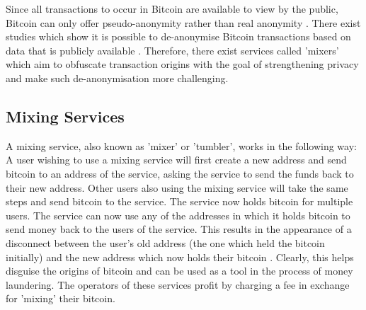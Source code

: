 Since all transactions to occur in Bitcoin are available to view by the public, Bitcoin can only offer pseudo-anonymity rather than real anonymity \cite{RefWorks:doc:5c3db7d6e4b0fa2b1fe68b48}. There exist studies which show it is possible to de-anonymise Bitcoin transactions based on data that is publicly available \cite{RefWorks:doc:5c3db7d6e4b0fa2b1fe68b48}. Therefore, there exist services called 'mixers' which aim to obfuscate transaction origins with the goal of strengthening privacy and make such de-anonymisation more challenging. 

\subsection{Mixing Services}\label{background-mixing-service}
A mixing service, also known as 'mixer' or 'tumbler', works in the following way: A user wishing to use a mixing service will first create a new address and send bitcoin to an address of the service, asking the service to send the funds back to their new address. Other users also using the mixing service will take the same steps and send bitcoin to the service. The service now holds bitcoin for multiple users. The service can now use any of the addresses in which it holds bitcoin to send money back to the users of the service. This results in the appearance of a disconnect between the user's old address (the one which held the bitcoin initially) and the new address which now holds their bitcoin \cite{RefWorks:doc:5c3dace5e4b0613d0cda512b}. Clearly, this helps disguise the origins of bitcoin and can be used as a tool in the process of money laundering. The operators of these services profit by charging a fee in exchange for 'mixing' their bitcoin. 


